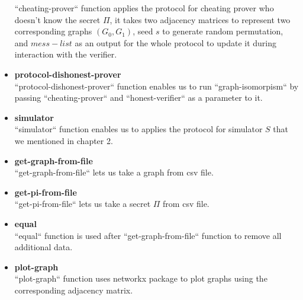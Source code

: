 \documentclass[12pt,a4paper]{article}
\begin{document}
\begin{itemize}
``cheating-prover`` function applies the protocol for cheating prover who doesn’t know the secret $\Pi$, it takes two adjacency matrices to represent two corresponding graphs $(G_0,G_1)$, seed $s$ to generate random permutation, and $mess-list$ as an output for the whole protocol to update it during interaction with the verifier.
\item \textbf{protocol-dishonest-prover}\\
``protocol-dishonest-prover`` function enables us to run ``graph-isomorpism`` by passing ``cheating-prover`` and ``honest-verifier`` as a parameter to it.
\item \textbf{simulator}\\
``simulator`` function enables us to applies the protocol for simulator $S$ that we mentioned in chapter 2.
\item \textbf{get-graph-from-file}\\
``get-graph-from-file`` lets us take a graph from csv file.
\item \textbf{get-pi-from-file}\\
``get-pi-from-file`` lets us take a secret $\Pi$ from csv file.
\item \textbf{equal}\\
``equal`` function is used after ``get-graph-from-file`` function to remove all additional data.
\item \textbf{plot-graph}\\
``plot-graph`` function uses networkx package to plot graphs using the corresponding adjacency matrix.
\end{itemize}
\end{document}
